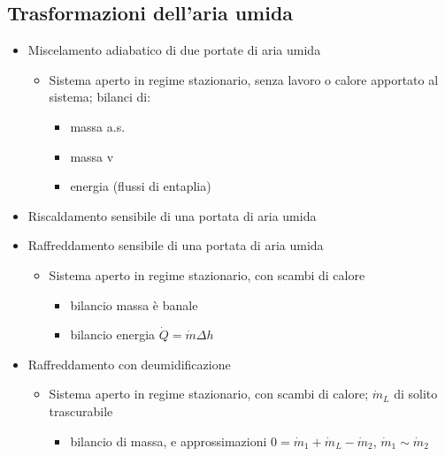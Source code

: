 \documentclass[letterpaper,10pt,italian]{jupyterBook}
\begin{document}
\subsection{Trasformazioni dell’aria umida}
\label{\detokenize{ch/thermodynamics/humid-air:trasformazioni-dell-aria-umida}}\begin{itemize}
\item {} 
\sphinxAtStartPar
Miscelamento adiabatico di due portate di aria umida
\begin{itemize}
\item {} 
\sphinxAtStartPar
Sistema aperto in regime stazionario, senza lavoro o calore apportato al sistema; bilanci di:
\begin{itemize}
\item {} 
\sphinxAtStartPar
massa a.s.

\item {} 
\sphinxAtStartPar
massa v

\item {} 
\sphinxAtStartPar
energia (flussi di entaplia)

\end{itemize}

\end{itemize}

\item {} 
\sphinxAtStartPar
Riscaldamento sensibile di una portata di aria umida

\item {} 
\sphinxAtStartPar
Raffreddamento sensibile di una portata di aria umida
\begin{itemize}
\item {} 
\sphinxAtStartPar
Sistema aperto in regime stazionario, con scambi di calore
\begin{itemize}
\item {} 
\sphinxAtStartPar
bilancio massa è banale

\item {} 
\sphinxAtStartPar
bilancio energia \(\dot{Q} = \dot{m} \Delta h\)

\end{itemize}

\end{itemize}

\item {} 
\sphinxAtStartPar
Raffreddamento con deumidificazione
\begin{itemize}
\item {} 
\sphinxAtStartPar
Sistema aperto in regime stazionario, con scambi di calore; \(\dot{m}_L\) di solito trascurabile
\begin{itemize}
\item {} 
\sphinxAtStartPar
bilancio di massa, e approssimazioni \(0 = \dot{m}_1 + \dot{m}_L - \dot{m}_2\), \(\dot{m}_1 \sim \dot{m}_2\)


\end{itemize}
\end{itemize}
\end{itemize}
\end{document}
